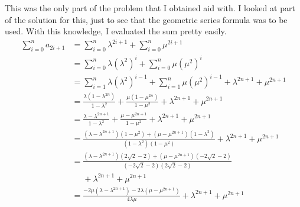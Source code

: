 \documentclass[12pt]{article}
\begin{document}
This was the only part of the problem that I obtained aid with.
I looked at part of the solution for this, just to see that the geometric series formula was to be used.
With this knowledge, I evaluated the sum pretty easily.
\begin{align*}
    \sum_{i=0}^{n} a_{2i+1} & = \sum_{i=0}^{n} \lambda^{2i+1} + \sum_{i=0}^{n} \mu^{2i+1}                                                                                                                                        \\
                            & = \sum_{i=0}^{n} \lambda\left(\lambda^2\right)^i + \sum_{i=0}^{n} \mu\left(\mu^2\right)^i                                                                                                          \\
                            & = \sum_{i=1}^{n} \lambda\left(\lambda^2\right)^{i-1} + \sum_{i=1}^{n} \mu\left(\mu^2\right)^{i-1} + \lambda^{2n+1} + \mu^{2n+1}                                                                    \\
                            & = \frac{\lambda\left(1-\lambda^{2n}\right)}{1-\lambda^2} + \frac{\mu\left(1-\mu^{2n}\right)}{1-\mu^2} + \lambda^{2n+1} + \mu^{2n+1}                                                                \\
                            & = \frac{\lambda-\lambda^{2n+1}}{1-\lambda^2} + \frac{\mu-\mu^{2n+1}}{1-\mu^2} + \lambda^{2n+1} + \mu^{2n+1}                                                                                        \\
                            & = \frac{\left(\lambda-\lambda^{2n+1}\right)\left(1-\mu^2\right) + \left(\mu-\mu^{2n+1}\right)\left(1-\lambda^2\right)}{\left(1-\lambda^2\right)\left(1-\mu^2\right)} + \lambda^{2n+1} + \mu^{2n+1} \\
                            & = \frac{\left(\lambda-\lambda^{2n+1}\right)\left(2\sqrt{2}-2\right) + \left(\mu-\mu^{2n+1}\right)\left(-2\sqrt{2}-2\right)}{\left(-2\sqrt{2}-2\right)\left(2\sqrt{2}-2\right)}                     \\
                            & \phantom{=}+ \lambda^{2n+1} + \mu^{2n+1}                                                                                                                                                           \\
                            & = \frac{-2\mu\left(\lambda-\lambda^{2n+1}\right) - 2\lambda\left(\mu-\mu^{2n+1}\right)}{4\lambda\mu} + \lambda^{2n+1} + \mu^{2n+1}                                                                 \\

\end{align*}
\end{document}
